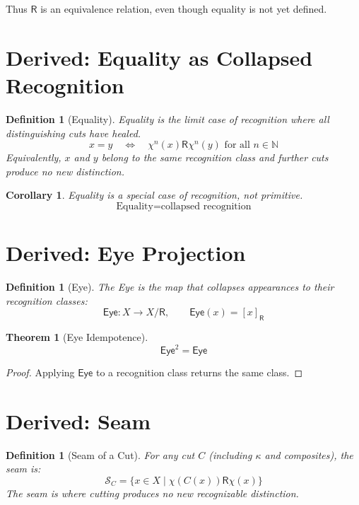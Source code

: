 \documentclass[12pt]{article}
\newtheorem{definition}[axiom]{Definition}
\newtheorem{theorem}[axiom]{Theorem}
\newtheorem{corollary}[axiom]{Corollary}
\newcommand{\cut}{\kappa}
\newcommand{\selfcut}{\chi}
\newcommand{\seam}{\mathcal{S}}
\newcommand{\eye}{\mathsf{Eye}}
\newcommand{\rec}{\mathsf{R}}
\begin{document}
Thus $\rec$ is an equivalence relation, even though equality is not yet defined.

\section{Derived: Equality as Collapsed Recognition}

\begin{definition}[Equality]
Equality is the limit case of recognition where all distinguishing cuts have healed.
\[
x = y \quad\Longleftrightarrow\quad \selfcut^n(x) \rec \selfcut^n(y) \text{ for all } n \in \mathbb{N}
\]
Equivalently, $x$ and $y$ belong to the same recognition class and
further cuts produce no new distinction.
\end{definition}

\begin{corollary}
Equality is a special case of recognition, not primitive.
\[
\boxed{\text{Equality} = \text{collapsed recognition}}
\]
\end{corollary}

\section{Derived: Eye Projection}

\begin{definition}[Eye]
The Eye is the map that collapses appearances to their recognition classes:
\[
\eye: X \longrightarrow X/\rec, \qquad \eye(x) = [x]_{\rec}
\]
\end{definition}

\begin{theorem}[Eye Idempotence]
\[
\eye^2 = \eye
\]
\end{theorem}
\begin{proof}
Applying $\eye$ to a recognition class returns the same class.
\end{proof}

\section{Derived: Seam}

\begin{definition}[Seam of a Cut]
For any cut $C$ (including $\cut$ and composites), the seam is:
\[
\seam_C = \{ x \in X \mid \selfcut(C(x)) \rec \selfcut(x) \}
\]
The seam is where cutting produces no new recognizable distinction.
\end{definition}
\end{document}
